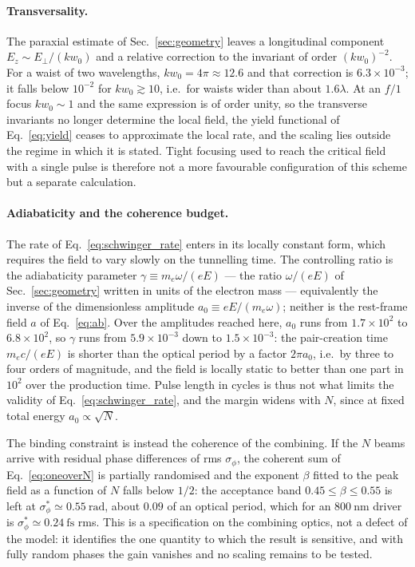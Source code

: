 \documentclass[aps,prd,reprint,superscriptaddress,nofootinbib,floatfix]{revtex4-2}
\begin{document}
\paragraph{Transversality.} The paraxial estimate of Sec.~\ref{sec:geometry}
leaves a longitudinal component $E_z\sim E_\perp/(kw_0)$ and a relative
correction to the invariant of order $(kw_0)^{-2}$. For a waist of two
wavelengths, $kw_0=4\pi\approx12.6$ and that correction is
$6.3\times10^{-3}$; it falls below $10^{-2}$ for $kw_0\gtrsim10$, i.e.\ for
waists wider than about $1.6\lambda$. At an $f/1$ focus $kw_0\sim1$ and the
same expression is of order unity, so the transverse invariants no longer
determine the local field, the yield functional of Eq.~\eqref{eq:yield}
ceases to approximate the local rate, and the scaling lies outside the regime
in which it is stated. Tight focusing used to reach the critical field with a
single pulse is therefore not a more favourable configuration of this scheme
but a separate calculation.

\paragraph{Adiabaticity and the coherence budget.} The rate of
Eq.~\eqref{eq:schwinger_rate} enters in its locally constant form, which
requires the field to vary slowly on the tunnelling time. The controlling
ratio is the adiabaticity parameter $\gamma\equiv m_e\omega/(eE)$ --- the ratio
$\omega/(eE)$ of Sec.~\ref{sec:geometry} written in units of the electron mass
--- equivalently the inverse of the dimensionless amplitude
$a_0\equiv eE/(m_e\omega)$; neither is the rest-frame field $a$ of
Eq.~\eqref{eq:ab}. Over the amplitudes reached here, $a_0$ runs from
$1.7\times10^{2}$ to $6.8\times10^{2}$, so $\gamma$ runs from
$5.9\times10^{-3}$ down to $1.5\times10^{-3}$: the pair-creation time
$m_ec/(eE)$ is shorter than the optical period by a factor $2\pi a_0$, i.e.\
by three to four orders of magnitude, and the field is locally static to
better than one part in $10^{2}$ over the production time. Pulse length in
cycles is thus not what limits the validity of
Eq.~\eqref{eq:schwinger_rate}, and the margin widens with $N$, since at fixed
total energy $a_0\propto\sqrt{N}$.

The binding constraint is instead the coherence of the combining. If the $N$
beams arrive with residual phase differences of rms $\sigma_\phi$, the
coherent sum of Eq.~\eqref{eq:oneoverN} is partially randomised and the
exponent $\beta$ fitted to the peak field as a function of $N$ falls below
$1/2$: the acceptance band $0.45\le\beta\le0.55$ is left at
$\sigma_\phi^\ast\simeq0.55~\mathrm{rad}$, about $0.09$ of an optical period,
which for an $800~\mathrm{nm}$ driver is $\sigma_\phi^\ast\simeq0.24~
\mathrm{fs}$ rms. This is a specification on the combining optics, not a
defect of the model: it identifies the one quantity to which the result is
sensitive, and with fully random phases the gain vanishes and no scaling
remains to be tested.
\end{document}
